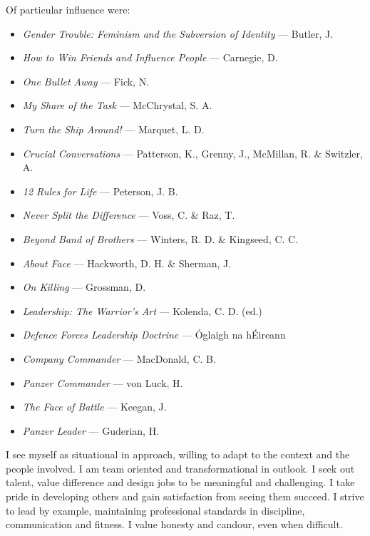 Of particular influence were:  
\begin{itemize}
	\item \nocite{BUTLER_1990} \textit{Gender Trouble: Feminism and the Subversion of Identity} — Butler, J. 
	\item \nocite{CARNEGIE_1936} \textit{How to Win Friends and Influence People} — Carnegie, D.  
	\item \nocite{FICK_2006} \textit{One Bullet Away} — Fick, N.  
	\item \nocite{MCCHRYSTAL_2013} \textit{My Share of the Task} — McChrystal, S. A.  
	\item \nocite{MARQUET_2015} \textit{Turn the Ship Around!} — Marquet, L. D.  
	\item \nocite{PATTERSON_2002} \textit{Crucial Conversations} — Patterson, K., Grenny, J., McMillan, R. \& Switzler, A.  
	\item \nocite{PETERSON_2018} \textit{12 Rules for Life} — Peterson, J. B.  
	\item \nocite{VOSS_2017} \textit{Never Split the Difference} — Voss, C. \& Raz, T.  
	\item \nocite{WINTERS_2006} \textit{Beyond Band of Brothers} — Winters, R. D. \& Kingseed, C. C.  
	\item \nocite{HACKWORTH_1990} \textit{About Face} — Hackworth, D. H. \& Sherman, J.  
	\item \nocite{GROSSMAN_1996} \textit{On Killing} — Grossman, D.  
	\item \nocite{KOLENDA_2001} \textit{Leadership: The Warrior’s Art} — Kolenda, C. D. (ed.)  
	\item \nocite{DF_LDR_20233} \textit{Defence Forces Leadership Doctrine} — Óglaigh na hÉireann  
	\item \nocite{MACDONALD_1984} \textit{Company Commander} — MacDonald, C. B.  
	\item \nocite{VON_LUCK_1989} \textit{Panzer Commander} — von Luck, H.  
	\item \nocite{KEEGAN_1976} \textit{The Face of Battle} — Keegan, J.  
	\item \nocite{GUDERIAN_1952} \textit{Panzer Leader} — Guderian, H.  
\end{itemize}

I see myself as situational in approach, willing to adapt to the context and the people involved. I am team oriented and transformational in outlook. I seek out talent, value difference and design jobs to be meaningful and challenging. I take pride in developing others and gain satisfaction from seeing them succeed. I strive to lead by example, maintaining professional standards in discipline, communication and fitness. I value honesty and candour, even when difficult.  

